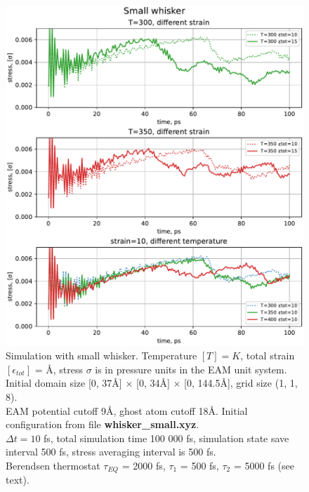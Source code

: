 \documentclass[12pt,a4paper]{article}
\begin{document}
\begin{figure}[h!]
	\centering
	\includegraphics[width=.95\linewidth]{img/milestone09-small.pdf}
	\caption{Simulation with small whisker. Temperature $[T]=K$, total strain $[\epsilon_{tot}]$ = Å, stress $\sigma$ is in pressure units in the EAM unit system.\\
	Initial domain size [0, 37Å] $\times$ [0, 34Å] $\times$ [0, 144.5Å], grid size (1, 1, 8).\\
	EAM potential cutoff 9Å, ghost atom cutoff 18Å. Initial configuration from file {\bf whisker\_small.xyz}.\\
	$\Delta t = 10$ fs, total simulation time 100 000 fs, simulation state save interval 500 fs, stress averaging interval is 500 fs.\\
	Berendsen thermostat $\tau_{EQ}$ = 2000 fs, $\tau_1$ = 500 fs, $\tau_2$ = 5000 fs (see text).
	}
	\label{fig:whisker-small}
\end{figure}
\end{document}
